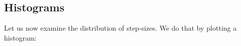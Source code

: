 \subsection{Histograms}
Let us now examine the distribution of step-sizes.
We do that by plotting a histogram:
